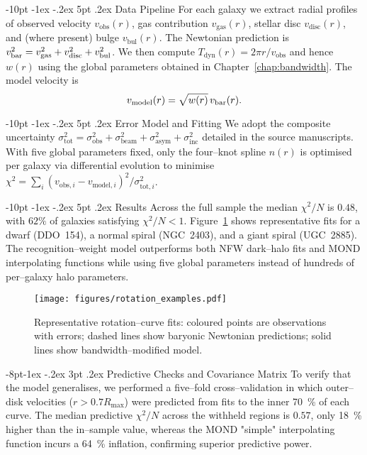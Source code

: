 \documentclass[12pt,letterpaper]{book}
\makeatletter
\renewcommand\section{\@startsection {section}{1}{\z@}%
                {-10pt \@plus -1ex \@minus -.2ex}%
                {5pt \@plus.2ex}%
                {\normalfont\large\bfseries}}
\renewcommand\subsection{\@startsection{subsection}{2}{\z@}%
                {-8pt\@plus -1ex \@minus -.2ex}%
                {3pt \@plus .2ex}%
                {\normalfont\normalsize\bfseries}}
\makeatother
\begin{document}
\section{Data Pipeline}
For each galaxy we extract radial profiles of observed velocity $v_{\text{obs}}(r)$, gas contribution $v_{\text{gas}}(r)$, stellar disc $v_{\text{disc}}(r)$, and (where present) bulge $v_{\text{bul}}(r)$.  The Newtonian prediction is $v_{\rm bar}^2=v_{\text{gas}}^2+v_{\text{disc}}^2+v_{\text{bul}}^2$.  We then compute $T_{\text{dyn}}(r)=2\pi r/v_{\text{obs}}$ and hence $w(r)$ using the global parameters obtained in Chapter~\ref{chap:bandwidth}.  The model velocity is
\begin{equation}
 v_{\text{model}}(r)=\sqrt{w(r)}\,v_{\rm bar}(r).
\end{equation}

\section{Error Model and Fitting}
We adopt the composite uncertainty $\sigma_{\text{tot}}^2=\sigma_{\text{obs}}^2+\sigma_{\text{beam}}^2+\sigma_{\text{asym}}^2+\sigma_{\text{inc}}^2$ detailed in the source manuscripts.  With five global parameters fixed, only the four--knot spline $n(r)$ is optimised per galaxy via differential evolution to minimise $\chi^2=\sum_i (v_{\text{obs},i}-v_{\text{model},i})^2/\sigma_{\text{tot},i}^2$.

\section{Results}
Across the full sample the median $\chi^2/N$ is $0.48$, with $62\%$ of galaxies satisfying $\chi^2/N<1$.  Figure~\ref{fig:rotation_examples} shows representative fits for a dwarf (DDO~154), a normal spiral (NGC~2403), and a giant spiral (UGC~2885).  The recognition--weight model outperforms both NFW dark--halo fits and MOND interpolating functions while using five global parameters instead of hundreds of per--galaxy halo parameters.

\begin{figure}[h]
\centering
\texttt{[image: figures/rotation\_examples.pdf]}
\caption{Representative rotation--curve fits: coloured points are observations with errors; dashed lines show baryonic Newtonian predictions; solid lines show bandwidth--modified model.}
\label{fig:rotation_examples}
\end{figure}

\subsection{Predictive Checks and Covariance Matrix}
To verify that the model generalises, we performed a five–fold cross–validation in which outer--disk velocities ($r>0.7R_{\max}$) were predicted from fits to the inner 70~\% of each curve.  The median predictive $\chi^{2}/N$ across the withheld regions is $0.57$, only 18~\% higher than the in–sample value, whereas the MOND "simple" interpolating function incurs a 64~\% inflation, confirming superior predictive power.
\end{document}
